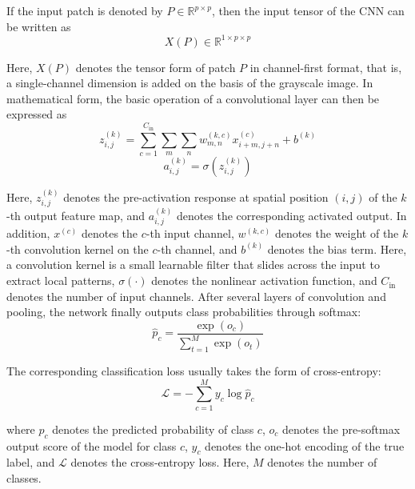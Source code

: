 \par If the input patch is denoted by $P\in\mathbb{R}^{p\times p}$, then the
input tensor of the CNN can be written as
\begin{equation}
    X(P)\in\mathbb{R}^{1\times p\times p}
    \label{eq:cnn-input-basic}
\end{equation}
\par Here, $X(P)$ denotes the tensor form of patch $P$ in channel-first format,
that is, a single-channel dimension is added on the basis of the grayscale
image. In mathematical form, the basic operation of a convolutional layer can
then be expressed as
\begin{equation}
    z_{i,j}^{(k)}=
    \sum_{c=1}^{C_{\mathrm{in}}}\sum_{m}\sum_{n}
    w_{m,n}^{(k,c)}x_{i+m,j+n}^{(c)}+b^{(k)}
    \label{eq:cnn-conv-basic}
\end{equation}
\begin{equation}
    a_{i,j}^{(k)}=\sigma\!\left(z_{i,j}^{(k)}\right)
    \label{eq:cnn-activation-basic}
\end{equation}
\par Here, $z_{i,j}^{(k)}$ denotes the pre-activation response at spatial
position $(i,j)$ of the $k$-th output feature map, and $a_{i,j}^{(k)}$ denotes
the corresponding activated output. In addition, $x^{(c)}$ denotes the $c$-th
input channel, $w^{(k,c)}$ denotes the weight of the $k$-th convolution kernel
on the $c$-th channel, and $b^{(k)}$ denotes the bias term. Here, a convolution
kernel is a small learnable filter that slides across the input to extract local
patterns, $\sigma(\cdot)$ denotes the nonlinear activation function, and
$C_{\mathrm{in}}$ denotes the number of input channels. After several layers of
convolution and pooling, the network finally outputs class probabilities through
softmax:
\begin{equation}
    \hat{p}_c=
    \frac{\exp(o_c)}{\sum_{t=1}^{M}\exp(o_t)}
    \label{eq:softmax-basic}
\end{equation}
\par The corresponding classification loss usually takes the form of
cross-entropy:
\begin{equation}
    \mathcal{L}=
    -\sum_{c=1}^{M} y_c\log \hat{p}_c
    \label{eq:cross-entropy-basic}
\end{equation}
\par where $\hat{p}_c$ denotes the predicted probability of class $c$, $o_c$
denotes the pre-softmax output score of the model for class $c$, $y_c$ denotes
the one-hot encoding of the true label, and $\mathcal{L}$ denotes the
cross-entropy loss. Here, $M$ denotes the number of classes.

